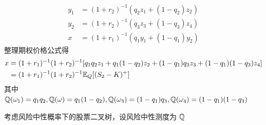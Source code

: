 \[
\begin{aligned}
    y_1&=(1+r_2)^{-1}(q_2z_1+(1-q_2)z_2)\\
    y_2&=(1+r_2)^{-1}(q_3z_3+(1-q_3)z_4)\\
    x&=(1+r_1)^{-1}(q_1y_1+(1-q_1)y_2)
\end{aligned}
\]
整理期权价格公式得
\[
\begin{aligned}
    x&=(1+r_1)^{-1}(1+r_2)^{-1}[q_1q_2z_1+q_1(1-q_2)z_2+(1-q_1)q_3z_3+(1-q_1)(1-q_3)z_4]\\
    &=(1+r_1)^{-1}(1+r_2)^{-1}\mathbb E_Q[(S_2-K)^+]
\end{aligned}
\]
其中 $\mathbb{Q}(\omega_1)=q_1q_2,\mathbb{Q}(\omega)=q_1(1-q_2),\mathbb{Q}(\omega_3)=(1-q_1)q_3,\mathbb{Q}(\omega_4)=(1-q_1)(1-q_3)$

考虑风险中性概率下的股票二叉树，设风险中性测度为 $\mathbb{Q}$

